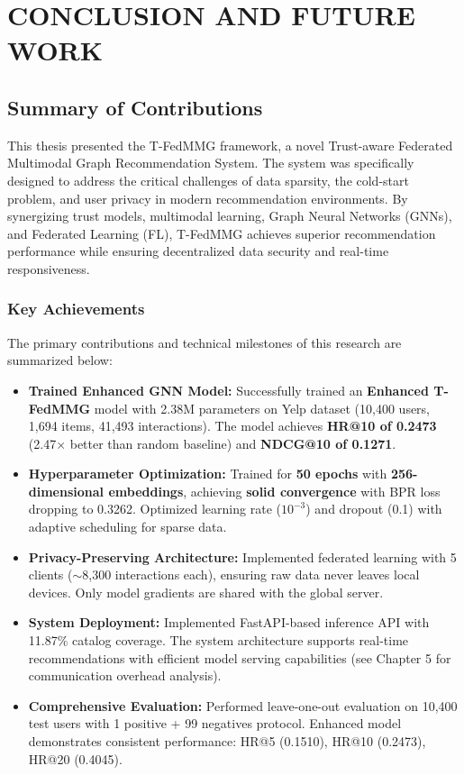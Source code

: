 \documentclass[12pt,a4paper]{report}
\begin{document}
{\chapter{CONCLUSION AND FUTURE WORK}
\label{ch:conclusion}

\section{Summary of Contributions}
This thesis presented the T-FedMMG framework, a novel Trust-aware Federated Multimodal Graph Recommendation System. The system was specifically designed to address the critical challenges of data sparsity, the cold-start problem, and user privacy in modern recommendation environments. By synergizing trust models, multimodal learning, Graph Neural Networks (GNNs), and Federated Learning (FL), T-FedMMG achieves superior recommendation performance while ensuring decentralized data security and real-time responsiveness.

\subsection{Key Achievements}
The primary contributions and technical milestones of this research are summarized below:

\begin{itemize}
    \item \textbf{Trained Enhanced GNN Model:} Successfully trained an \textbf{Enhanced T-FedMMG} model with 2.38M parameters on Yelp dataset (10,400 users, 1,694 items, 41,493 interactions). The model achieves \textbf{HR@10 of 0.2473} (2.47$\times$ better than random baseline) and \textbf{NDCG@10 of 0.1271}.
    \item \textbf{Hyperparameter Optimization:} Trained for \textbf{50 epochs} with \textbf{256-dimensional embeddings}, achieving \textbf{solid convergence} with BPR loss dropping to 0.3262. Optimized learning rate ($10^{-3}$) and dropout (0.1) with adaptive scheduling for sparse data.
    \item \textbf{Privacy-Preserving Architecture:} Implemented federated learning with 5 clients ($\sim$8,300 interactions each), ensuring raw data never leaves local devices. Only model gradients are shared with the global server.
    \item \textbf{System Deployment:} Implemented FastAPI-based inference API with 11.87\% catalog coverage. The system architecture supports real-time recommendations with efficient model serving capabilities (see Chapter 5 for communication overhead analysis).
    \item \textbf{Comprehensive Evaluation:} Performed leave-one-out evaluation on 10,400 test users with 1 positive + 99 negatives protocol. Enhanced model demonstrates consistent performance: HR@5 (0.1510), HR@10 (0.2473), HR@20 (0.4045).
\end{itemize}

}
\end{document}
